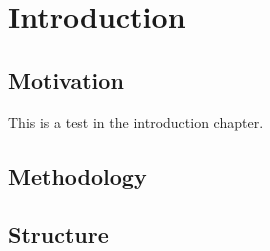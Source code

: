 \chapter{Introduction}
\label{chp:introduction} 


\section{Motivation}

This is a test in the introduction chapter. 

\section{Methodology}

\section{Structure}